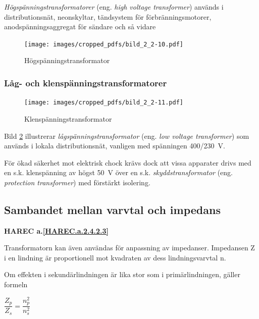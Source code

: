 \emph{Högspänningstransformatorer} (eng. \emph{high voltage transformer})
används i distributionsnät, neonskyltar, tändsystem för förbränningsmotorer,
anodspänningsaggregat för sändare och så vidare

\begin{figure}[ht]
\begin{center}
\texttt{[image: images/cropped\_pdfs/bild\_2\_2-10.pdf]}
\caption{Högspänningstransformator}
\label{fig:BildII2-10}
\end{center}
\end{figure}

\subsubsection{Låg- och klenspänningstransformatorer}

\begin{figure}[ht]
\begin{center}
\texttt{[image: images/cropped\_pdfs/bild\_2\_2-11.pdf]}
\caption{Klenspänningstransformator}
\label{fig:BildII2-11}
\end{center}
\end{figure}

Bild \ref{fig:BildII2-11} illustrerar \emph{lågspänningstransformator} (eng.
\emph{low voltage transformer}) som används i lokala distributionsnät,
vanligen med spänningen 400/230~V.

För ökad säkerhet mot elektrisk chock krävs dock att vissa
apparater drivs med en s.k. klenspänning av högst 50~V över en s.k.
\emph{skyddstransformator} (eng. \emph{protection transformer}) med förstärkt
isolering.

\subsection{Sambandet mellan varvtal och impedans}
\textbf{HAREC a.\ref{HAREC.a.2.4.2.3}\label{myHAREC.a.2.4.2.3}}

Transformatorn kan även användas för anpassning av impedanser.
Impedansen Z i en lindning är proportionell mot kvadraten av dess
lindningsvarvtal n.

Om effekten i sekundärlindningen är lika stor som i primärlindningen, gäller
formeln

\(\dfrac{Z_p}{Z_s} = \dfrac{n_p^2}{n_s^2}\)

